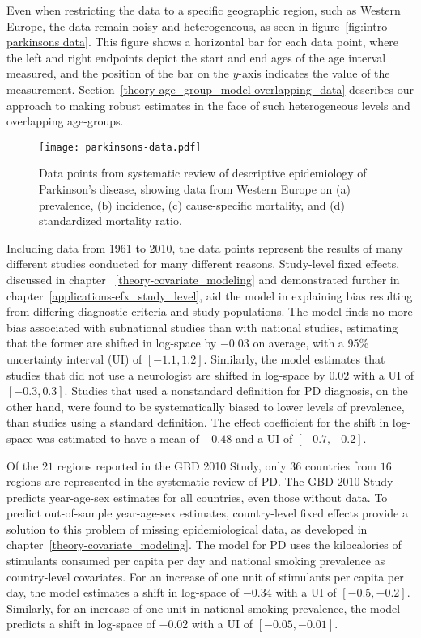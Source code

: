 Even when restricting the data to a
specific geographic region, such as Western Europe, the data remain
noisy and heterogeneous, as seen in figure~\ref{fig:intro-parkinsons
  data}. This figure shows a horizontal bar for each data point, where
the left and right endpoints depict the start and end ages of the age
interval measured, and the position of the bar on the $y$-axis indicates the value of the
measurement. Section~\ref{theory-age_group_model-overlapping_data}
describes our approach to making
robust estimates in the face of such heterogeneous levels and
overlapping age-groups.

    \begin{figure}[h]
        \begin{center}
            \texttt{[image: parkinsons-data.pdf]}
            \caption{Data points from systematic review of descriptive
              epidemiology of Parkinson's disease, showing data from
              Western Europe on (a) prevalence, (b) incidence, (c)
              cause-specific mortality, and (d) standardized mortality
              ratio.}
            \label{fig:intro-parkinsons data}
        \end{center}
    \end{figure}

Including data from 1961 to 2010, the data points represent the results
of many different studies conducted for many different reasons.
Study-level fixed effects, discussed in chapter
~\ref{theory-covariate_modeling} and demonstrated further in
chapter~\ref{applications-efx_study_level}, aid the model in
explaining bias resulting from differing diagnostic criteria and study
populations.  The model finds no more bias associated with subnational
studies than with national studies, estimating that the former are
shifted in log-space by $-0.03$ on average, with a 95\% uncertainty
interval (UI) of $[-1.1, 1.2]$.  Similarly, the model estimates that studies that did not use a
neurologist are shifted in log-space by $0.02$ with a
UI of $[-0.3, 0.3]$.  Studies that used a nonstandard definition for PD
diagnosis, on the other hand, were found to be systematically biased
to lower levels of prevalence, than studies using a standard definition. The
effect coefficient for the shift in log-space was estimated to have a
mean of $-0.48$ and a UI of $[-0.7, -0.2]$.

Of the $21$ regions reported in the GBD 2010 Study, only $36$ countries
from $16$ regions are represented in the systematic review of PD.  The GBD
2010 Study predicts year-age-sex estimates for all countries, even
those without data.  To predict out-of-sample year-age-sex estimates, country-level fixed
effects provide a solution to this problem of missing epidemiological data, 
as developed in chapter~\ref{theory-covariate_modeling}.  The model for PD uses the
kilocalories of stimulants consumed per capita per day and national smoking prevalence
as country-level covariates.  For an increase of one unit of stimulants per
capita per day, the model estimates a shift in log-space of $-0.34$
with a UI of $[-0.5, -0.2]$.  Similarly, for an increase of one unit in national
smoking prevalence, the model predicts a shift in log-space of $-0.02$ with a UI
of $[-0.05, -0.01]$.

